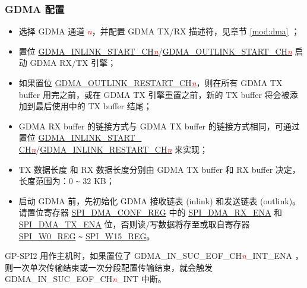 \documentclass[main\_\_CN.tex]{subfiles}
\begin{document}
\subsubsection{GDMA 配置}\label{para:gdma-config}

\begin{itemize}
    \item 选择 GDMA 通道 \textcolor{red}{\it{n}}，并配置 GDMA TX/RX 描述符，见章节 \ref{mod:dma} \textit{}；

    \item 置位 \hyperref[fielddesc:GDMAINLINKSTARTCHN]{GDMA\_INLINK\_START\_CH\textcolor{red}{\it{n}}}/\hyperref[fielddesc:GDMAOUTLINKSTARTCHN]{GDMA\_OUTLINK\_START\_CH\textcolor{red}{\it{n}}}  启动 GDMA RX/TX 引擎；

    \item 如果置位 \hyperref[fielddesc:GDMAOUTLINKRESTARTCHN]{GDMA\_OUTLINK\_RESTART\_CH\textcolor{red}{\it{n}}}，则在所有 GDMA TX buffer 用完之前，或在 GDMA TX 引擎重置之前，新的 TX buffer 将会被添加到最后使用中的 TX buffer 结尾；

    \item GDMA RX buffer 的链接方式与 GDMA TX buffer 的链接方式相同，可通过置位 \hyperref[fielddesc:GDMAINLINKSTARTCHN]{GDMA\_INLINK\_START\_\\CH\textcolor{red}{\it{n}}}/\hyperref[fielddesc:GDMAINLINKRESTARTCHN]{GDMA\_INLINK\_RESTART\_CH\textcolor{red}{\it{n}}} 来实现；

    \item TX 数据长度 和 RX 数据长度分别由 GDMA TX buffer 和 RX buffer 决定，长度范围为：0 \verb+~+ 32 KB；

    \item 启动 GDMA 前，先初始化 GDMA 接收链表 (inlink) 和发送链表 (outlink)。请置位寄存器 \hyperref[regdesc:SPIDMACONFREG]{SPI\_DMA\_CONF\_REG} 中的 \hyperref[fielddesc:SPIDMARXENA]{SPI\_DMA\_RX\_ENA} 和 \hyperref[fielddesc:SPIDMATXENA]{SPI\_DMA\_TX\_ENA} 位，否则读/写数据将存至或取自寄存器 \hyperref[regdesc:SPIW0REG]{SPI\_W0\_REG} \verb+~+ \hyperref[regdesc:SPIW0REG]{SPI\_W15\_REG}。

\end{itemize}

GP-SPI2 用作主机时，如果置位了 GDMA\_IN\_SUC\_EOF\_CH\textcolor{red}{\it{n}}\_INT\_ENA ，则一次单次传输结束或一次分段配置传输结束，就会触发 GDMA\_IN\_SUC\_EOF\_CH\textcolor{red}{\it{n}}\_INT 中断。
\end{document}
